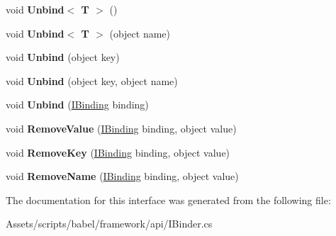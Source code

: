 \begin{DoxyCompactItemize}
\item 
\hypertarget{interfacebabel_1_1framework_1_1api_1_1_i_binder_a916a0bfef185d1529f1370a79a585bb4}{void {\bfseries Unbind$<$ T $>$} ()}\label{interfacebabel_1_1framework_1_1api_1_1_i_binder_a916a0bfef185d1529f1370a79a585bb4}

\item 
\hypertarget{interfacebabel_1_1framework_1_1api_1_1_i_binder_adff747fb13c6fcbc76cb9c4d0c935a4c}{void {\bfseries Unbind$<$ T $>$} (object name)}\label{interfacebabel_1_1framework_1_1api_1_1_i_binder_adff747fb13c6fcbc76cb9c4d0c935a4c}

\item 
\hypertarget{interfacebabel_1_1framework_1_1api_1_1_i_binder_a7fbc00de4ee1a24f6ff3a1e01d658a19}{void {\bfseries Unbind} (object key)}\label{interfacebabel_1_1framework_1_1api_1_1_i_binder_a7fbc00de4ee1a24f6ff3a1e01d658a19}

\item 
\hypertarget{interfacebabel_1_1framework_1_1api_1_1_i_binder_ad925c5544e63e3c198551a4c76882aba}{void {\bfseries Unbind} (object key, object name)}\label{interfacebabel_1_1framework_1_1api_1_1_i_binder_ad925c5544e63e3c198551a4c76882aba}

\item 
\hypertarget{interfacebabel_1_1framework_1_1api_1_1_i_binder_a6eaf1663ce098a9f3abbf3182435f44b}{void {\bfseries Unbind} (\hyperlink{interfacebabel_1_1framework_1_1api_1_1_i_binding}{I\-Binding} binding)}\label{interfacebabel_1_1framework_1_1api_1_1_i_binder_a6eaf1663ce098a9f3abbf3182435f44b}

\item 
\hypertarget{interfacebabel_1_1framework_1_1api_1_1_i_binder_ac474d26468af6703dd1a55c96a918746}{void {\bfseries Remove\-Value} (\hyperlink{interfacebabel_1_1framework_1_1api_1_1_i_binding}{I\-Binding} binding, object value)}\label{interfacebabel_1_1framework_1_1api_1_1_i_binder_ac474d26468af6703dd1a55c96a918746}

\item 
\hypertarget{interfacebabel_1_1framework_1_1api_1_1_i_binder_a7f85832b11bb771bd1d6ec043bce2d27}{void {\bfseries Remove\-Key} (\hyperlink{interfacebabel_1_1framework_1_1api_1_1_i_binding}{I\-Binding} binding, object value)}\label{interfacebabel_1_1framework_1_1api_1_1_i_binder_a7f85832b11bb771bd1d6ec043bce2d27}

\item 
\hypertarget{interfacebabel_1_1framework_1_1api_1_1_i_binder_aa0e2406e6803718e463095a807cbd525}{void {\bfseries Remove\-Name} (\hyperlink{interfacebabel_1_1framework_1_1api_1_1_i_binding}{I\-Binding} binding, object value)}\label{interfacebabel_1_1framework_1_1api_1_1_i_binder_aa0e2406e6803718e463095a807cbd525}

\end{DoxyCompactItemize}


The documentation for this interface was generated from the following file\-:\begin{DoxyCompactItemize}
\item 
Assets/scripts/babel/framework/api/I\-Binder.\-cs\end{DoxyCompactItemize}
